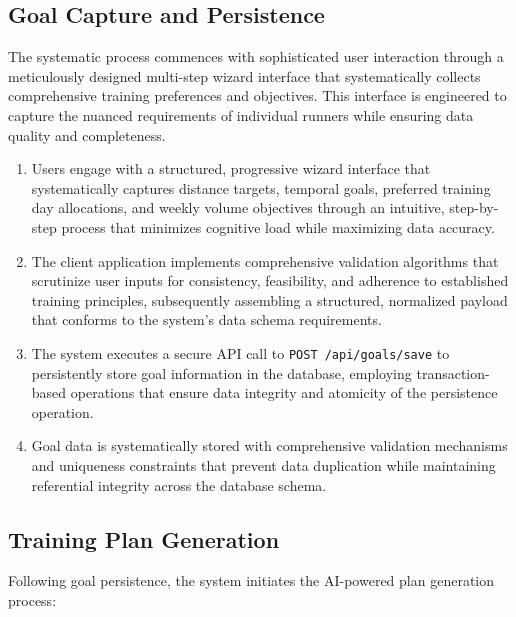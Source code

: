 \subsection{Goal Capture and Persistence}

The systematic process commences with sophisticated user interaction through a meticulously designed multi-step wizard interface that systematically collects comprehensive training preferences and objectives. This interface is engineered to capture the nuanced requirements of individual runners while ensuring data quality and completeness.

\begin{enumerate}
    \item Users engage with a structured, progressive wizard interface that systematically captures distance targets, temporal goals, preferred training day allocations, and weekly volume objectives through an intuitive, step-by-step process that minimizes cognitive load while maximizing data accuracy.
    
    \item The client application implements comprehensive validation algorithms that scrutinize user inputs for consistency, feasibility, and adherence to established training principles, subsequently assembling a structured, normalized payload that conforms to the system's data schema requirements.
    
    \item The system executes a secure API call to \texttt{POST /api/goals/save} to persistently store goal information in the database, employing transaction-based operations that ensure data integrity and atomicity of the persistence operation.
    
    \item Goal data is systematically stored with comprehensive validation mechanisms and uniqueness constraints that prevent data duplication while maintaining referential integrity across the database schema.
\end{enumerate}

\subsection{Training Plan Generation}

Following goal persistence, the system initiates the AI-powered plan generation process:

